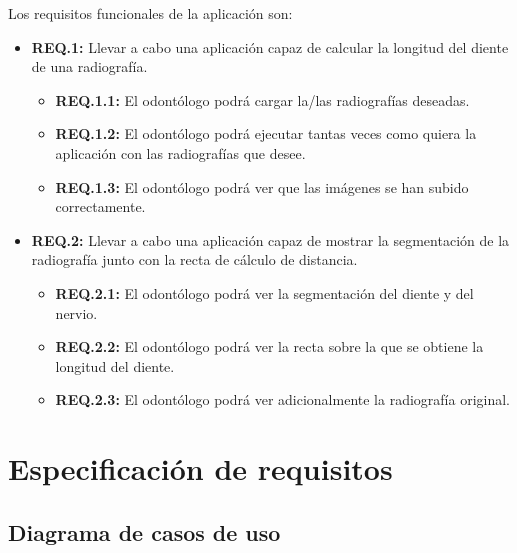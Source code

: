 Los requisitos funcionales de la aplicación son:
\begin{itemize}
	\item \textbf{REQ.1:} Llevar a cabo una aplicación capaz de calcular la longitud del diente de una radiografía.
	\begin{itemize}
	\item \textbf{REQ.1.1:} El odontólogo podrá cargar la/las radiografías deseadas.
	\item \textbf{REQ.1.2:} El odontólogo podrá ejecutar tantas veces como quiera la aplicación con las radiografías que desee.
	\item \textbf{REQ.1.3:} El odontólogo podrá ver que las imágenes se han subido correctamente.
	\end{itemize}
	
	\item \textbf{REQ.2:} Llevar a cabo una aplicación capaz de mostrar la segmentación de la radiografía junto con la recta de cálculo de distancia.
	\begin{itemize}
	\item \textbf{REQ.2.1:} El odontólogo podrá ver la segmentación del diente y del nervio.
	\item \textbf{REQ.2.2:} El odontólogo podrá ver la recta sobre la que se obtiene la longitud del diente.
	\item \textbf{REQ.2.3:} El odontólogo podrá ver adicionalmente la radiografía original.
	\end{itemize}
\end{itemize}

\newpage
\section{Especificación de requisitos}
\subsection{Diagrama de casos de uso}

